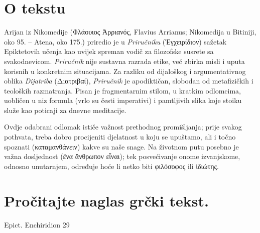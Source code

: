 


\section*{O tekstu}

Arijan iz Nikomedije (Φλάουιος Ἀρριανός, Flavius Arrianus; Nikomedija u Bitiniji, oko 95. – Atena, oko 175.) priredio je u \textit{Priručniku} (Ἐγχειρίδιον) sažetak Epiktetovih učenja kao uvijek spreman vodič za filozofske susrete sa svakodnevicom. \textit{Priručnik} nije sustavna razrada etike, već zbirka misli i uputa korisnih u konkretnim situacijama. Za razliku od dijaloškog i argumentativnog oblika \textit{Dijatriba} (Δıατριβαί), \textit{Priručnik} je apodiktičan, slobodan od metafizičkih i teoloških razmatranja. Pisan je fragmentarnim stilom, u kratkim odlomcima, uobličen u niz formula (vrlo su česti imperativi) i pamtljivih slika koje stoiku služe kao poticaji za dnevne meditacije.

Ovdje odabrani odlomak ističe važnost prethodnog promišljanja; prije svakog pothvata, treba dobro procijeniti djelatnost u koju se upuštamo, ali i točno spoznati (καταμανθάνειν) kakve su naše snage. Na životnom putu posebno je važna dosljednost (ἕνα ἄνθρωπον εἶναι); tek posvećivanje onome izvanjskome, odnosno unutarnjem, određuje hoće li netko biti φιλόσοφος ili ἰδιώτης.

\newpage

\section*{Pročitajte naglas grčki tekst.}

Epict. Enchiridion 29


\medskip


